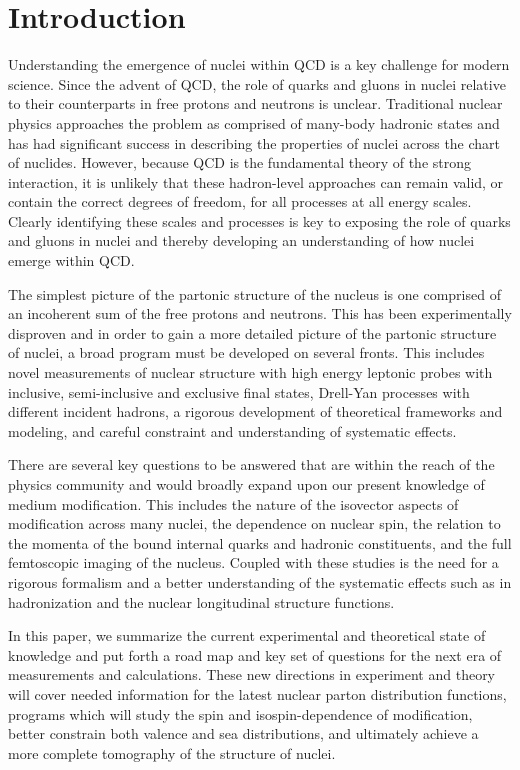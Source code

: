 \section{Introduction}


Understanding the emergence of nuclei within QCD is a key challenge for modern science.  Since the advent of QCD, the role of quarks and gluons in nuclei relative to their counterparts in free protons and neutrons is unclear.  Traditional nuclear physics approaches the problem as comprised of many-body hadronic states and has had significant success in describing the properties of nuclei across the chart of nuclides. However, because QCD is the fundamental theory of the strong interaction, it is unlikely that these hadron-level approaches can remain valid, or contain the correct degrees of freedom, for all processes at all energy scales. Clearly identifying these scales and processes is key to exposing the role of quarks and gluons in nuclei and thereby developing an understanding of how nuclei emerge within QCD.

The simplest picture of the partonic structure of the nucleus is one comprised of an incoherent sum of the free protons and neutrons.  This has been experimentally disproven and in order to gain a more detailed picture of the partonic structure of nuclei, a broad program must be developed on several fronts.  This includes novel measurements of nuclear structure with high energy leptonic probes with inclusive, semi-inclusive and exclusive final states, Drell-Yan processes with different incident hadrons, a rigorous development of theoretical frameworks and modeling, and  careful constraint and understanding of systematic effects.

There are several key questions to be answered that are within the reach of the physics community and would broadly expand upon our present knowledge of medium modification.  This includes the nature of the isovector aspects of modification across many nuclei, the dependence on nuclear spin, the relation to the momenta of the bound internal quarks and hadronic constituents, and the full femtoscopic imaging of the nucleus.  Coupled with these studies is the need for a rigorous formalism and a better understanding of the systematic effects such as in hadronization and the nuclear longitudinal structure functions. 

In this paper, we summarize the current experimental and theoretical state of knowledge and put forth a road map and key set of questions for the next era of measurements and calculations.  These new directions in experiment and theory will cover needed information for the latest nuclear parton distribution functions, programs which will study the spin and isospin-dependence of modification, better constrain both valence and sea distributions, and ultimately achieve a more complete tomography of the structure of nuclei.

